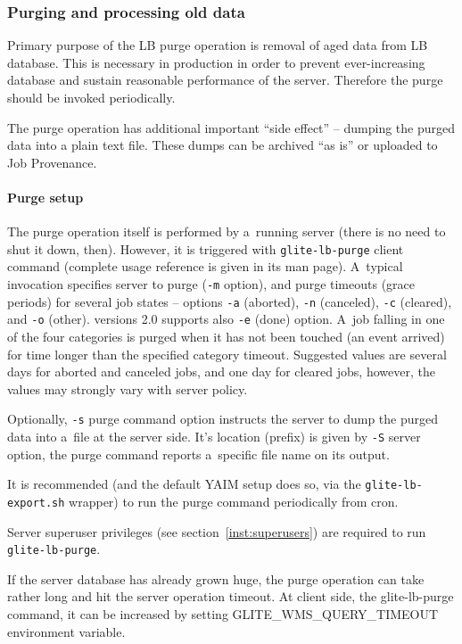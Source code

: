 \subsubsection{Purging and processing old data}
\label{run:purge}

Primary purpose of the LB purge operation  is removal of aged data from LB database. This is necessary in
production in order to prevent ever-increasing database and sustain reasonable
performance of the server. Therefore the purge should be invoked periodically.

The purge operation has additional important ``side effect'' -- dumping the
purged data into a plain text file. These dumps can be archived ``as is'' or
uploaded to Job Provenance. 

\paragraph{Purge setup}

The purge operation itself is performed by a~running \LB server
(there is no need to shut it down, then).
However, it is triggered with \verb'glite-lb-purge' client command
(complete usage reference is given in its man page).
A~typical invocation specifies \LB server to purge (\verb'-m' option),
and purge timeouts (grace periods) for several job states -- options
\verb'-a' (aborted), \verb'-n' (canceled), \verb'-c' (cleared), and
\verb'-o' (other). \LB versions 2.0 supports also \verb'-e' (done) option.
A~job falling in one of the four categories is purged when it has not been
touched (\ie an event arrived) for time longer than the specified category
timeout.
Suggested values are several days for aborted and canceled jobs,
and one day for cleared jobs, however, the values may strongly vary
with \LB server policy.

Optionally, \verb'-s' purge command option instructs the server to
dump the purged data into a~file at the server side.
It's location (prefix) is given by \verb'-S' server option,
the purge command reports a~specific file name on its output.

It is recommended (and the default YAIM setup does so, via
the \verb'glite-lb-export.sh' wrapper) to run the purge
command periodically from cron.

Server superuser privileges (see section~\ref{inst:superusers}) are required to run \verb'glite-lb-purge'.

If the server database has already grown huge, the purge operation can take
rather long and hit the \LB server operation timeout. At client side, \ie the
glite-lb-purge command, it can be increased by setting GLITE\_WMS\_QUERY\_TIMEOUT
environment variable. 

